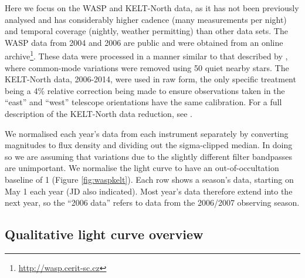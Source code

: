 \documentclass[]{rsos}
\begin{document}
Here we focus on the WASP and KELT-North data, as it has not been previously analysed and
has considerably higher cadence (many measurements per night) and temporal coverage
(nightly, weather permitting) than other data sets. The WASP data from 2004 and 2006 are
public and were obtained from an online
archive\footnote{\href{http://wasp.cerit-sc.cz}{http://wasp.cerit-sc.cz}}. These data
were processed in a manner similar to that described by \cite{2014MNRAS.441.2845V},
where common-mode variations were removed using 50 quiet nearby stars. The KELT-North
data, 2006-2014, were used in raw form, the only specific treatment being a 4\% relative
correction being made to ensure observations taken in the ``east'' and ``west'' telescope
orientations have the same calibration. For a full description of the KELT-North data
reduction, see \cite{2012ApJ...761..123S}.

We normalised each year's data from each instrument separately by converting magnitudes
to flux density and dividing out the sigma-clipped median. In doing so we are assuming
that variations due to the slightly different filter bandpasses are unimportant. We
normalise the light curve to have an out-of-occultation baseline of 1 (Figure
\ref{fig:waspkelt}). Each row shows a season's data, starting on May 1 each year (JD also
indicated). Most year's data therefore extend into the next year, so the ``2006 data''
refers to data from the 2006/2007 observing season.

\subsection{Qualitative light curve overview}\label{ss:quallc}
\end{document}
